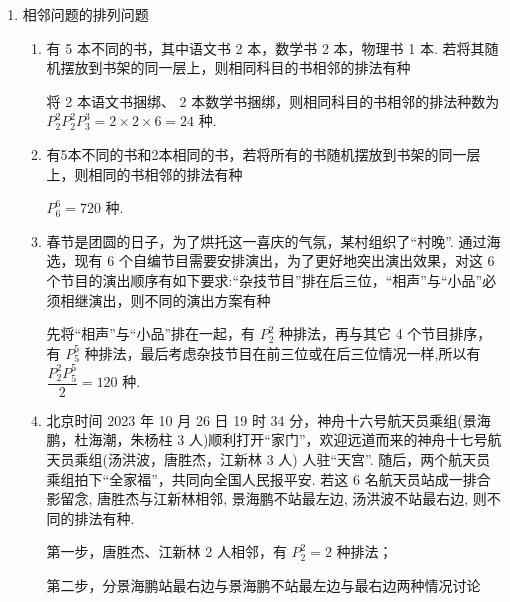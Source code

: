\begin{enumerate}
\begin{enumerate}
\begin{jieda}
\begin{enumerate}
                所以第 264 个数是 305421，第 265 个数是 310245.
            \end{enumerate}
        \end{jieda}
    \end{enumerate}

    \item 相邻问题的排列问题
    \begin{enumerate}
        \item 有 5 本不同的书，其中语文书 2 本，数学书 2 本，物理书 1 本. 若将其随机摆放到书架的同一层上，则相同科目的书相邻的排法有种
        \begin{jieda}
            将 2 本语文书捆绑、 2 本数学书捆绑，则相同科目的书相邻的排法种数为 $P_{2}^{2}P_{2}^{2}P_{3}^{3} = 2 \times  2 \times  6 = {24}$ 种.
        \end{jieda}

        \item 有5本不同的书和2本相同的书，若将所有的书随机摆放到书架的同一层上，则相同的书相邻的排法有种
        \begin{jieda}
            $P_{6}^{6} = {720}$ 种.
        \end{jieda}

        \item 春节是团圆的日子，为了烘托这一喜庆的气氛，某村组织了“村晚”. 通过海选，现有 6 个自编节目需要安排演出，为了更好地突出演出效果，对这 6 个节目的演出顺序有如下要求:“杂技节目”排在后三位，“相声”与“小品”必须相继演出，则不同的演出方案有种
        \begin{jieda}
            先将“相声”与“小品”排在一起，有 $P_{2}^{2}$ 种排法，再与其它 4 个节目排序，有 $P_{5}^{5}$ 种排法，最后考虑杂技节目在前三位或在后三位情况一样,所以有 $\dfrac{P_{2}^{2}P_{5}^{5}}{2} = {120}$ 种.
        \end{jieda}
        \item 北京时间 2023 年 10 月 26 日 19 时 34 分，神舟十六号航天员乘组(景海鹏，杜海潮，朱杨柱 3 人)顺利打开“家门”，欢迎远道而来的神舟十七号航天员乘组(汤洪波，唐胜杰，江新林 3 人) 人驻“天宫”. 随后，两个航天员乘组拍下“全家福”，共同向全国人民报平安. 若这 6 名航天员站成一排合影留念, 唐胜杰与江新林相邻, 景海鹏不站最左边, 汤洪波不站最右边, 则不同的排法有种.
        \begin{jieda}
            第一步，唐胜杰、江新林 2 人相邻，有 $P_{2}^{2} = 2$ 种排法；
            
            第二步，分景海鹏站最右边与景海鹏不站最左边与最右边两种情况讨论
            

\end{jieda}
\end{enumerate}
\end{enumerate}
